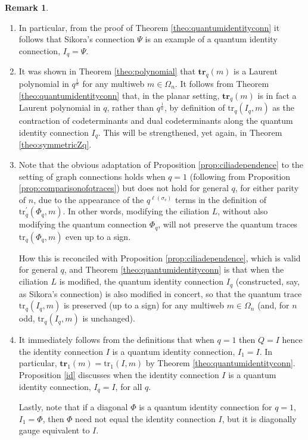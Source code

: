 \documentclass[12pt, reqno]{amsart}
\theoremstyle{definition}
\newtheorem{rema}[theo]{Remark}
\newcommand{\trqc}{\mathrm{tr}_q}%
\newcommand{\trq}{\mathbf{tr}_q}%
\begin{document}
\begin{rema}\label{rema:moreremarksregardingquantumidentityconnection}
\begin{enumerate}
\item
In particular, from the proof of Theorem \ref{theo:quantumidentityconn} it follows that Sikora's connection $\Psi$ is an example of a quantum identity connection, $I_q=\Psi$.
\item
It was shown in Theorem \ref{theo:polynomial} that $\trq(m)$ is a Laurent polynomial in $q^\frac{1}{n}$ for any multiweb $m\in\Omega_n$.  It follows from Theorem \ref{theo:quantumidentityconn} that, in the planar setting, $\trq(m)$ is in fact a Laurent polynomial in $q$, rather than $q^\frac{1}{n}$, by definition of $\trqc(I_q,m)$ as the contraction of codeterminants and dual codeterminants along the quantum identity connection $I_q$.  This will be strengthened, yet again, in Theorem \ref{theo:symmetricZq}.
\item\label{item2:rema:qtraceispolyexpressioninqconnection}
Note that the obvious adaptation of Proposition \ref{prop:ciliadependence} to the setting of graph connections holds when $q=1$ (following from Proposition \ref{prop:comparisonofqtraces}) but does not hold for general $q$, for either parity of $n$, due to the appearance of the $q^{\ell(\sigma_v)}$ terms in the definition of $\trqc^\prime(\Phi_q,m)$.  In other words, modifying the ciliation $L$, without also modifying the quantum connection $\Phi_q$, will not preserve the quantum traces $\trqc(\Phi_q,m)$ even up to a sign.  

How this is reconciled with Proposition \ref{prop:ciliadependence}, which is valid for general $q$, and Theorem \ref{theo:quantumidentityconn} is that when the ciliation $L$ is modified, the quantum identity connection $I_q$ (constructed, say, as Sikora's connection) is also modified in concert, so that the quantum trace $\trqc(I_q,m)$ is preserved (up to a sign) for any multiweb $m\in\Omega_n$ (and, for $n$ odd, $\trqc(I_q,m)$ is unchanged).
\item\label{rema:classicaltrace}
It immediately follows from the definitions that when $q=1$ then $Q=I$ hence the identity connection $I$ is a quantum identity connection, $I_1=I$.  In particular, $\mathbf{tr}_1(m)=\mathrm{tr}_1(I,m)$ by Theorem \ref{theo:quantumidentityconn}.  Proposition \ref{id} discusses when the identity connection $I$ is a quantum identity connection, $I_q=I$, for all $q$.  

Lastly, note that if a diagonal $\Phi$  is a quantum identity connection for $q=1$, $I_1=\Phi$,  then $\Phi$ need not equal the identity connection $I$, but it is diagonally gauge equivalent to $I$.
\end{enumerate}
\end{rema}
\end{document}
